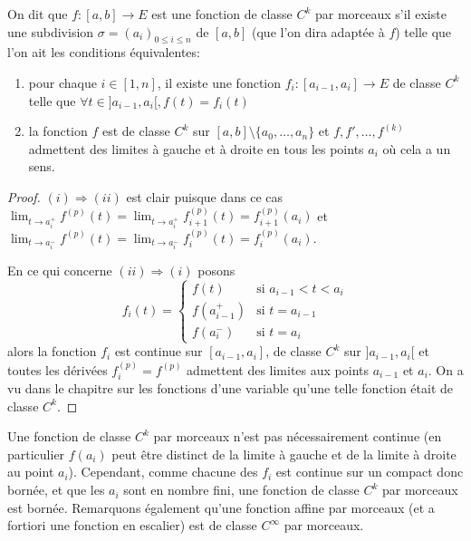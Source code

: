 \begin{de}
On dit que $f : [a,b] \to E$ est une fonction de classe $C^k$ par morceaux s'il existe une subdivision $\sigma = (a_i)_{0 \leq i \leq n}$ de $[a,b]$ (que l'on dira adaptée à $f$) telle que l'on ait les conditions équivalentes:
\begin{enumerate}
  \item pour chaque $i \in [1,n]$, il existe une fonction $f_i : [a_{i-1},a_i] \to E$ de classe $C^k$ telle que $\forall t \in ]a_{i-1},a_i[, f(t) = f_i(t)$
  \item la fonction $f$ est de classe $C^k$ sur $[a,b] \setminus \{a_0,\ldots,a_n\}$ et $f,f',\ldots,f^{(k)}$ admettent des limites à gauche et à droite en tous les points $a_i$ où cela a un sens.
\end{enumerate}
\end{de}

\begin{proof}
$(i) \Rightarrow (ii)$ est clair puisque dans ce cas $\lim_{t \to a_i^+} f^{(p)}(t) = \lim_{t \to a_i^+} f_{i+1}^{(p)}(t) = f_{i+1}^{(p)}(a_i)$ et $\lim_{t \to a_i^-} f^{(p)}(t) = \lim_{t \to a_i^-} f_i^{(p)}(t) = f_i^{(p)}(a_i)$.

En ce qui concerne $(ii) \Rightarrow (i)$ posons
\[
f_i(t) = \begin{cases}
f(t) &\text{si } a_{i-1} < t < a_i \\
f(a_{i-1}^+) &\text{si } t = a_{i-1} \\
f(a_i^-) &\text{si } t = a_i
\end{cases}
\]
alors la fonction $f_i$ est continue sur $[a_{i-1},a_i]$, de classe $C^k$ sur $]a_{i-1},a_i[$ et toutes les dérivées $f_i^{(p)} = f^{(p)}$ admettent des limites aux points $a_{i-1}$ et $a_i$. On a vu dans le chapitre sur les fonctions d'une variable qu'une telle fonction était de classe $C^k$.
\end{proof}

\begin{rem}
Une fonction de classe $C^k$ par morceaux n'est pas nécessairement continue (en particulier $f(a_i)$ peut être distinct de la limite à gauche et de la limite à droite au point $a_i$). Cependant, comme chacune des $f_i$ est continue sur un compact donc bornée, et que les $a_i$ sont en nombre fini, une fonction de classe $C^k$ par morceaux est bornée. Remarquons également qu'une fonction affine par morceaux (et a fortiori une fonction en escalier) est de classe $C^\infty$ par morceaux.
\end{rem}

